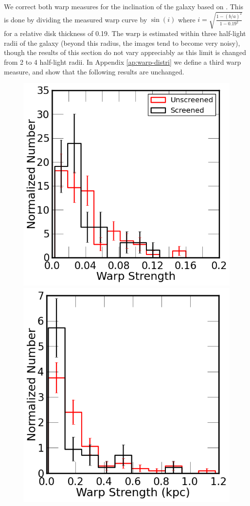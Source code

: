 \documentclass[twocolappendix, numberedappendix]{emulateapj}
\begin{document}
We correct both warp measures
for the inclination of the galaxy based on \citet{geha06}.
This is done by dividing the measured warp curve by $\sin(i)$ where $i =
\sqrt{\frac{1 - (b/a)^2}{1 - 0.19^2}}$ for a relative disk thickness of 0.19.
The warp is estimated within three half-light radii of the galaxy (beyond
this radius, the images tend to become very noisy), though the results of
this section do not vary
appreciably as this limit is changed from 2 to 4 half-light radii.
In Appendix \ref{ap:warp-distri} we define a third warp measure,
and show that the following results are unchanged.

\begin{figure}
\begin{center}
\includegraphics[scale=0.45]{figures/warp-hist-sc-unsc.png}
\includegraphics[scale=0.44]{figures/warp-kpc-hist-sc-unsc.png}

\end{center}
\end{figure}
\end{document}
